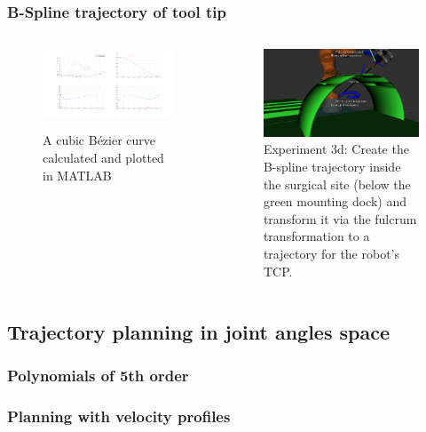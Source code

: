 \begin{frame}
\frametitle{B-Spline trajectory of tool tip}
\begin{columns}
\begin{center}
\begin{figure}[!htb]
\centering
\includegraphics[width=\textwidth]{../images/bezier_path.png}\\
\caption{A cubic B\'ezier curve calculated and plotted in MATLAB} 
\end{figure}
\end{center}

\begin{center}
\begin{figure}[!htb]
\centering
\includegraphics[width=\textwidth]{../images/robot_planner3/3d_bezier_spline.png}
\caption{Experiment 3d: Create the B-spline trajectory inside the surgical site (below the green mounting dock) and transform it via the fulcrum transformation to a trajectory for the robot's TCP.}
\label{robot-planner3d-bezier-spline}
\end{figure}
\end{center}

\end{columns}
\end{frame}

\subsection{Trajectory planning in joint angles space}

\begin{frame}
\frametitle{Polynomials of 5th order}
\end{frame}

\begin{frame}
\frametitle{Planning with velocity profiles}
\end{frame}
